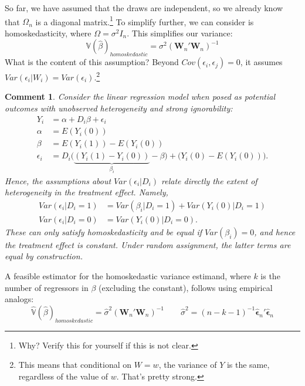 \documentclass{tufte-handout}
\theoremstyle{break}
\newtheorem{cmt}{Comment}
\begin{document}
So far, we have assumed that the draws are independent, so we already know that $\Omega_{n}$ is a diagonal matrix.\footnote{Why? Verify this for yourself if this is not clear.} To simplify further, we can consider is homoskedasticity, where $\Omega = \sigma^{2}I_{n}$. This simplifies our variance:
\begin{equation}
  \mathbb{V}(\hat{\beta})_{homoskedastic} = \sigma^{2} (\mathbf{W}_{n}'\mathbf{W}_{n})^{-1}
\end{equation}
What is the content of this assumption? Beyond $Cov(\epsilon_{i},\epsilon_{j}) = 0$, it assumes $Var(\epsilon_{i} |W_{i}) = Var(\epsilon_{i})$.\footnote{This means that conditional on $W=w$, the variance of $Y$ is the same, regardless of the value of $w$. That's pretty strong.}

\begin{boxF}
\begin{cmt}
  \label{cmt:heteroskedasticity_design}
  Consider the linear regression model when posed as potential outcomes with unobserved heterogeneity and strong ignorability:
  \begin{align*}
    Y_{i} &= \alpha + D_{i}\beta + \epsilon_{i}\\
    \alpha &= E(Y_{i}(0))\\
    \beta &= E(Y_{i}(1)) - E(Y_{i}(0))\\
    \epsilon_{i} &= D_{i}\bigg(\underbrace{(Y_{i}(1) - Y_{i}(0))}_{\beta_{i}} - \beta\bigg)  + \bigg(Y_{i}(0) - E(Y_{i}(0))\bigg).
  \end{align*}
Hence, the assumptions about $Var(\epsilon_{i} | D_{i})$ relate directly the extent of heterogeneity in the treatment effect.
Namely, 
\begin{align}
  Var(\epsilon_{i} |D_{i} = 1) &= Var(\beta_{i} | D_{i} = 1) + Var(Y_{i}(0)|D_{i} = 1)\\
  Var(\epsilon_{i} |D_{i} = 0) &=  Var(Y_{i}(0)|D_{i} = 0).
\end{align}
These can only satisfy homoskedasticity and be equal if $Var(\beta_{i}) = 0$, and hence the treatment effect is constant. Under random assignment, the latter terms are equal by construction.
\end{cmt}
\end{boxF}
A feasible estimator for the homoskedastic variance estimand, where $k$ is the number of regressors in $\beta$ (excluding  the constant), follows using empirical analogs:
\begin{equation}
  \label{eq:homoskedastic}
  \hat{\mathbb{V}}(\hat{\beta})_{homoskedastic} = \hat{\sigma}^{2} (\mathbf{W}_{n}'\mathbf{W}_{n})^{-1}  \qquad \hat{\sigma}^{2} = (n-k-1)^{-1}\boldsymbol{\hat{\epsilon}}_{n}' \boldsymbol{\hat{\epsilon}}_{n} 
\end{equation}
\end{document}
